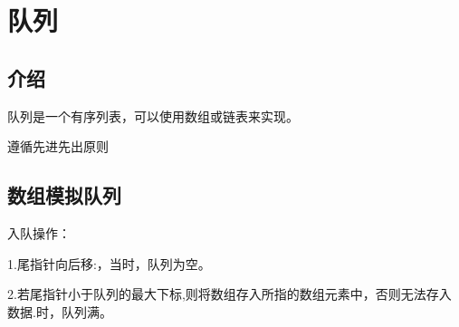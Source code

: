 \documentclass[a4paper]{report}
\begin{document}
\section{队列}
\subsection{介绍}

队列是一个有序列表，可以使用数组或链表来实现。

遵循先进先出原则
\subsection{数组模拟队列}
入队操作：

1.尾指针向后移:，当时，队列为空。

2.若尾指针小于队列的最大下标,则将数组存入所指的数组元素中，否则无法存入数据.时，队列满。
\end{document}
